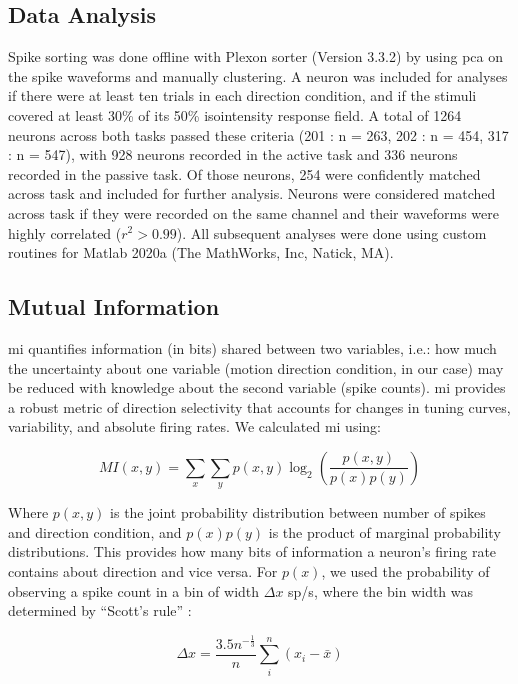 \subsection*{Data Analysis} 
Spike sorting was done offline with Plexon sorter (Version 3.3.2) by using \gls{pca} on the spike waveforms and manually clustering. A neuron was included for analyses if there were at least ten trials in each direction condition, and if the stimuli covered at least 30\% of its 50\% isointensity response field. A total of 1264 neurons across both tasks passed these criteria (201 : n = 263, 202 : n = 454, 317 : n = 547), with 928 neurons recorded in the active task and 336 neurons recorded in the passive task. Of those neurons, 254 were confidently matched across task and included for further analysis. Neurons were considered matched across task if they were recorded on the same channel and their waveforms were highly correlated ($r^2>0.99$). All subsequent analyses were done using custom routines for Matlab 2020a (The MathWorks, Inc, Natick, MA).

\subsection*{Mutual Information} 
\Gls{mi} quantifies information (in bits) shared between two variables, i.e.: how much the uncertainty about one variable (motion direction condition, in our case) may be reduced with knowledge about the second variable (spike counts). \Gls{mi} provides a robust metric of direction selectivity that accounts for changes in tuning curves, variability, and absolute firing rates. We calculated \gls{mi} using:

\begin{equation}
	MI(x,y)= \sum_x \sum_y p(x,y) \log_2\left(\frac{p(x,y)}{p(x) p(y)}\right)
\end{equation}

Where $p(x,y)$ is the joint probability distribution between number of spikes and direction condition, and $p(x) p(y)$ is the product of marginal probability distributions. 
This provides how many bits of information a neuron's firing rate contains about direction and vice versa. 
For $p(x)$, we used the probability of observing a spike count in a bin of width $\Delta x$ sp/s, where the bin width was determined by ``Scott's rule'' \parencite{SCOTT1979}:

\begin{equation}\label{eq:spikebin}
	\Delta x = \frac{3.5 n^{-\frac{1}{3}}}{n} \sum_{i}^{n}\left( x_i-\bar{x} \right)
\end{equation}

